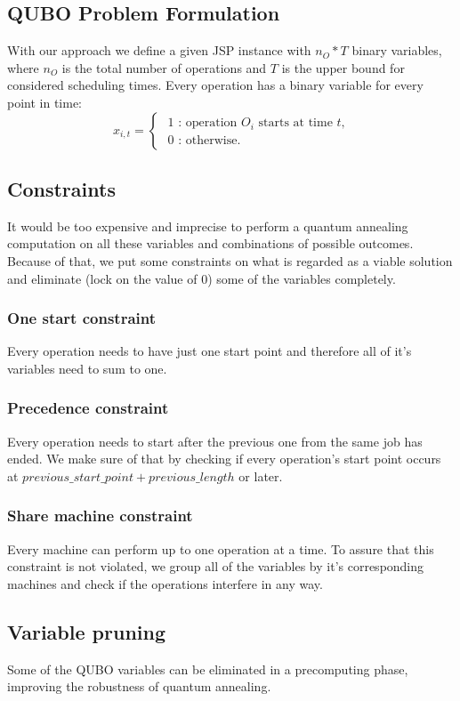 \documentclass[letterpaper, 11pt]{article}
\begin{document}
\begin{multicols}{2}
\subsection{QUBO Problem Formulation}
With our approach we define a given JSP instance 
with $n_O * T$ binary variables, where $n_O$ is the total number of 
operations and $T$ is the upper bound for considered scheduling times. 
Every operation has a binary variable for every point in time:
\begin{equation}
    x_{i,t} =
    \begin{cases}
        \text{ 1 : operation $O_i$ starts at time $t$,} \\
        \text{ 0 : otherwise.}
    \end{cases}
\end{equation}

\subsection{Constraints}
It would be too expensive and imprecise to perform a quantum 
annealing computation on all these variables and combinations of
possible outcomes. Because of that, we put some constraints on
what is regarded as a viable solution and eliminate (lock on the
value of 0) some of the variables completely.
\subsubsection{One start constraint}
Every operation needs to have just one start point and therefore all of
it's variables need to sum to one. 
\subsubsection{Precedence constraint}
Every operation needs to start after the previous one from the same job
has ended. We make sure of that by checking if every operation's 
start point occurs at $previous\_start\_point + previous\_length$ or later.
\subsubsection{Share machine constraint}
Every machine can perform up to one operation at a time. To assure that
this constraint is not violated, we group all of the variables by it's
corresponding machines and check if the operations interfere in any way.

\subsection{Variable pruning}
Some of the QUBO variables can be eliminated in a precomputing phase,
improving the robustness of quantum annealing. 

\end{multicols}
\end{document}
